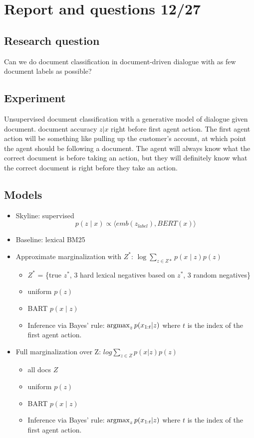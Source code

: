 \documentclass[11pt]{article}
\begin{document}
\appendix

\section{Report and questions 12/27}
\subsection{Research question}
Can we do document classification in document-driven dialogue with as few document labels as possible?

\subsection{Experiment}
Unsupervised document classification with a generative model of dialogue given document.
document accuracy $z|x$ right before first agent action.
The first agent action will be something like pulling up the customer's account,
at which point the agent should be following a document.
The agent will always know what the correct document is before taking an action,
but they will definitely know what the correct document is right before they take an action.

\subsection{Models}
\begin{itemize}
\item Skyline: supervised $$p(z \mid x) \propto \langle emb(z_{label}), BERT(x)\rangle$$
\item Baseline: lexical BM25
\item Approximate marginalization with $Z^*$: $\log\sum_{z\in Z*} p(x\mid z) p(z)$
    \begin{itemize}
    \item $Z^*$ = \{true $z^*$, 3 hard lexical negatives based on $z^*$, 3 random negatives\}
    \item uniform $p(z)$
    \item BART $p(x \mid z)$
    \item Inference via Bayes' rule: $\operatorname*{argmax}_z p(x_{1:t}|z)$ where $t$ is the index
        of the first agent action.
    \end{itemize}
\item Full marginalization over Z: $log\sum_{z\in Z} p(x|z)p(z)$
    \begin{itemize}
    \item all docs $Z$
    \item uniform $p(z)$
    \item BART $p(x \mid z)$
    \item Inference via Bayes' rule: $\operatorname*{argmax}_z p(x_{1:t}|z)$ where $t$ is the index
        of the first agent action.
    \end{itemize}
\end{itemize}
\end{document}
